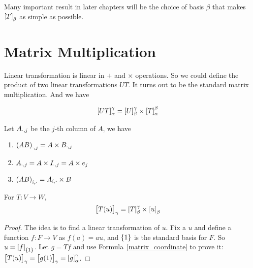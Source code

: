 Many important result in later chapters will be the choice of basis $\beta$ that makes $\coordinate{T}_\beta$ as simple as possible.

\section{Matrix Multiplication}

\begin{theorem}
    Linear transformation is linear in $+$ and $\times$ operations. So we could define the product of two linear transformations $UT$. It turns out to be the standard matrix multiplication. And we have

    \begin{equation}\label{matrix_coordinate}
        \coordinate{UT}_{\alpha}^{\gamma} = \coordinate{U}_{\beta}^{\gamma} \times \coordinate{T}_{\alpha}^{\beta}
    \end{equation}
\end{theorem}

\begin{theorem}
    Let ${A}_{\cdot, {j}}$ be the $j$-th column of $A$, we have
\begin{enumerate}
    \item ${(AB)}_{\cdot, {j}} = A \times {B}_{\cdot, {j}}$
    \item ${A}_{\cdot, {j}} = A \times {I}_{\cdot, {j}} = A \times e_j$
    \item ${(AB)}_{{i},\cdot} = {A}_{{i},\cdot} \times B$
\end{enumerate}
\end{theorem}





\begin{theorem}
    For $T: V \rightarrow W$,
    \begin{equation}
        \coordinate{T(u)}_\gamma = \coordinate{T}_{\beta}^{\gamma} \times \coordinate{u}_{\beta}
    \end{equation}    
\end{theorem}
\begin{proof}
    The idea is to find a linear transformation of $u$. Fix a $u$ and define a function $f: F \rightarrow V$ as $f(a) = au$, and $\set{1}$ is the standard basis for $F$. So $u = \coordinate{f}_{\set{1}}$. Let $g=Tf$ and use Formula~\ref{matrix_coordinate} to prove it: $\coordinate{T(u)}_\gamma = \coordinate{g(1)}_\gamma = \coordinate{g}_{\alpha}^{\gamma}$.
\end{proof}

